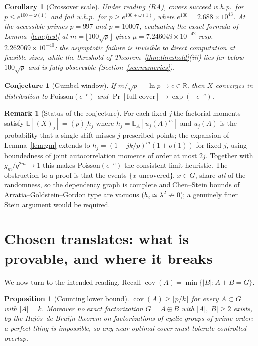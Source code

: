 \documentclass[11pt]{article}
\newtheorem{proposition}{Proposition}
\newtheorem{corollary}{Corollary}
\newtheorem{conjecture}{Conjecture}
\theoremstyle{definition}
\newtheorem{remark}{Remark}
\newcommand{\E}{\mathbb{E}}
\newcommand{\Prob}{\Pr}
\newcommand{\cov}{\operatorname{cov}}
\begin{document}
\begin{corollary}[Crossover scale]\label{cor:crossover}
Under reading (RA), covers succeed w.h.p.\ for $p\le e^{100-\omega(1)}$ and
fail w.h.p.\ for $p\ge e^{100+\omega(1)}$, where
$e^{100}=2.688\times10^{43}$. At the accessible primes $p=997$ and $p=10007$,
evaluating the exact formula of Lemma~\ref{lem:first} at
$m=\lfloor100\sqrt p\rfloor$ gives
$\mu=7.246049\times10^{-42}$ resp.\ $2.262069\times10^{-40}$: the asymptotic
failure is invisible to direct computation at feasible sizes, while the
threshold of Theorem~\ref{thm:threshold}(iii) lies far below
$100\sqrt p$ and is fully observable (Section~\ref{sec:numerics}).
\end{corollary}

\begin{conjecture}[Gumbel window]\label{conj:gumbel}
If $m/\sqrt p-\ln p\to c\in\mathbb R$, then
$X$ converges in distribution to $\mathrm{Poisson}(e^{-c})$ and
$\Prob[\text{full cover}]\to\exp(-e^{-c})$.
\end{conjecture}

\begin{remark}[Status of the conjecture]\label{rem:window}
For each fixed $j$ the factorial moments satisfy
$\E[(X)_j]=(p)_j h_j$ where $h_j=\E_A[u_j(A)^m]$ and $u_j(A)$ is the
probability that a single shift misses $j$ prescribed points; the expansion
of Lemma~\ref{lem:gm} extends to $h_j=(1-jk/p)^{m}(1+o(1))$ for fixed $j$,
using boundedness of joint autocorrelation moments of order at most $2j$.
Together with $g_m/q^{2m}\to1$ this makes $\mathrm{Poisson}(e^{-c})$ the
consistent limit heuristic. The obstruction to a proof is that the events
$\{x\text{ uncovered}\}$, $x\in G$, share \emph{all} of the randomness, so the
dependency graph is complete and Chen--Stein bounds of Arratia--Goldstein--Gordon
type are vacuous ($b_2\simeq\lambda^2\not\to0$); a genuinely finer Stein
argument would be required.
\end{remark}

\section{Chosen translates: what is provable, and where it breaks}\label{sec:RB}

We now turn to the intended reading. Recall $\cov(A)=\min\{|B|:A+B=G\}$.

\begin{proposition}[Counting lower bound]\label{prop:lower}
$\cov(A)\ge\lceil p/k\rceil$ for every $A\subset G$ with $|A|=k$. Moreover no
exact factorization $G=A\oplus B$ with $|A|,|B|\ge2$ exists, by the
Haj\'os--de Bruijn theorem on factorizations of cyclic groups of prime order;
a perfect tiling is impossible, so any near-optimal cover must tolerate
controlled overlap.
\end{proposition}
\end{document}

